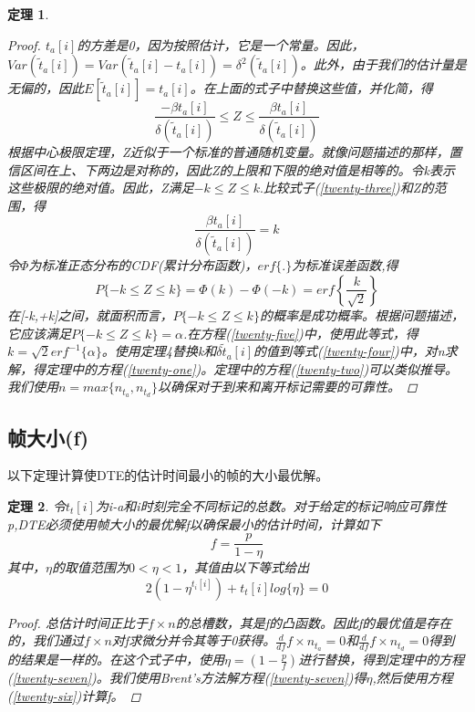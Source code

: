 \documentclass[UTF8]{ctexart}
\newtheorem{theorem}{定理}
\newtheorem*{proof}{证明}
\begin{document}
\begin{theorem}
\begin{proof}
			$t_a[i]$的方差是0，因为按照估计，它是一个常量。因此，$Var(\widetilde{t}_a[i])=Var(\widetilde{t}_a[i]-t_a[i])=\delta^2(\widetilde{t}_a[i])$。此外，由于我们的估计量是无偏的，因此$E[\widetilde{t}_a[i]]=t_a[i]$。在上面的式子中替换这些值，并化简，得
			\begin{equation}\label{twenty-three}
			\frac{-\beta t_a[i]}{\delta(\widetilde{t}_a[i])}\le Z \le \frac{\beta t_a[i]}{\delta(\widetilde{t}_a[i])}
			\end{equation}
			根据中心极限定理，Z近似于一个标准的普通随机变量。就像问题描述的那样，置信区间在上、下两边是对称的，因此Z的上限和下限的绝对值是相等的。令k表示这些极限的绝对值。因此，Z满足$-k\le Z\le k.$比较式子(\ref{twenty-three})和Z的范围，得
			\begin{equation}\label{twenty-four}
			\frac{\beta t_a[i]}{\delta(\widetilde{t}_a[i])}=k
			\end{equation}
			令$\Phi$为标准正态分布的CDF(累计分布函数)，$erf\{.\}$为标准误差函数,得
			\begin{equation}\label{twenty-five}
			P\{-k\le Z\le k\} = \Phi(k)-\Phi(-k)=erf\left\{\frac{k}{\sqrt{2}}\right\}
			\end{equation}
			在[-k,+k]之间，就面积而言，$P\{-k \le Z \le k\}$的概率是成功概率。根据问题描述，它应该满足$P\{-k \le Z \le k\}=\alpha$.在方程(\ref{twenty-five})中，使用此等式，得$k=\sqrt{2}erf^{-1}\{\alpha\}$。使用定理4替换k和$\delta{\widetilde{t}_a[i]}$的值到等式(\ref{twenty-four})中，对n求解，得定理中的方程(\ref{twenty-one})。定理中的方程(\ref{twenty-two})可以类似推导。我们使用$n=max\{n_{t_a},n_{t_d}\}$以确保对于到来和离开标记需要的可靠性。
		\end{proof}
	\end{theorem}
	\subsection{帧大小(f)}
	
	以下定理计算使DTE的估计时间最小的帧的大小最优解。
	\begin{theorem}
		令$t_t[i]$为i-a和i时刻完全不同标记的总数。对于给定的标记响应可靠性p,DTE必须使用帧大小的最优解f以确保最小的估计时间，计算如下
		\begin{equation}\label{twenty-six}
		f = \frac{p}{1-\eta}
		\end{equation}
		其中，$\eta$的取值范围为$0 < \eta < 1$，其值由以下等式给出
		\begin{equation}\label{twenty-seven}
		2(1-\eta^{t_i[i]})+t_t[i]log\{\eta\}=0
		\end{equation}
		\begin{proof}
			总估计时间正比于$f\times n$的总槽数，其是f的凸函数。因此f的最优值是存在的，我们通过$f\times n$对f求微分并令其等于0获得。$\frac{d}{df}f\times n_{t_a}=0$和$\frac{d}{df}f\times n_{t_d}=0$得到的结果是一样的。在这个式子中，使用$\eta=(1-\frac{p}{f})$进行替换，得到定理中的方程(\ref{twenty-seven})。我们使用Brent's方法解方程(\ref{twenty-seven})得$\eta$,然后使用方程(\ref{twenty-six})计算f。
		\end{proof}
	\end{theorem}
\end{document}
